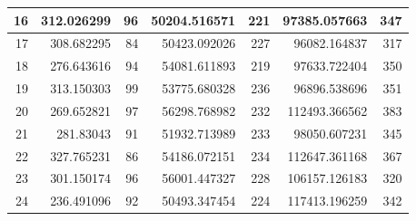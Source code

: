 \begin{table}
\begin{adjustwidth}{}{}
{{\begin{tabular}{|r|r|r|r|r|r|r|}
\hline
16                                         & 312.026299                   & 96                                    & 50204.516571                   & 221                                   & 97385.057663                 & 347                                    \\ 
\hline
17                                         & 308.682295                   & 84                                    & 50423.092026                   & 227                                   & 96082.164837                 & 317                                    \\ 
\hline
18                                         & 276.643616                   & 94                                    & 54081.611893                   & 219                                   & 97633.722404                 & 350                                    \\ 
\hline
19                                         & 313.150303                   & 99                                    & 53775.680328                   & 236                                   & 96896.538696                 & 351                                    \\ 
\hline
20                                         & 269.652821                   & 97                                    & 56298.768982                   & 232                                   & 112493.366562                & 383                                    \\ 
\hline
21                                         & 281.83043                    & 91                                    & 51932.713989                   & 233                                   & 98050.607231                 & 345                                    \\ 
\hline
22                                         & 327.765231                   & 86                                    & 54186.072151                   & 234                                   & 112647.361168                & 367                                    \\ 
\hline
23                                         & 301.150174                   & 96                                    & 56001.447327                   & 228                                   & 106157.126183                & 320                                    \\ 
\hline
24                                         & 236.491096                   & 92                                    & 50493.347454                   & 224                                   & 117413.196259                & 342                                    \\ 

\end{tabular}}}
\end{adjustwidth}
\end{table}
